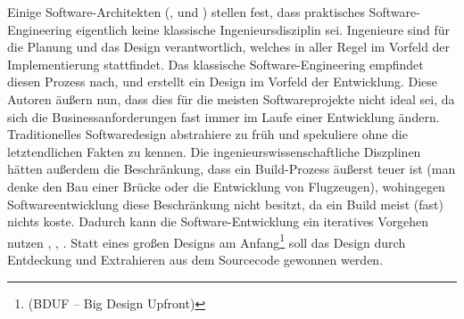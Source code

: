 



Einige Software-Architekten (\citeauthor*{neal_ford_emergent_2010}, \citeauthor*{jack_reeves_three_1992} und \citeauthor{glenn_vanderburg_real_2010}) stellen fest, dass praktisches Software\hyp{}Engineering eigentlich keine klassische Ingenieursdisziplin sei. Ingenieure sind für die Planung und das Design verantwortlich, welches in aller Regel im Vorfeld der Implementierung stattfindet. Das klassische Software-Engineering empfindet diesen Prozess nach, und erstellt ein Design im Vorfeld der Entwicklung. Diese Autoren äußern nun, dass dies für die meisten Softwareprojekte nicht ideal sei, da sich die Businessanforderungen fast immer im Laufe einer Entwicklung ändern. Traditionelles Softwaredesign abstrahiere zu früh und spekuliere ohne die letztendlichen Fakten zu kennen. Die ingenieurswissenschaftliche Diszplinen hätten außerdem die Beschränkung, dass ein Build-Prozess äußerst teuer ist (man denke den Bau einer Brücke oder die Entwicklung von Flugzeugen), wohingegen Softwareentwicklung diese Beschränkung nicht besitzt, da ein Build meist (fast) nichts koste. Dadurch kann die Software-Entwicklung ein iteratives Vorgehen nutzen \citep{neal_ford_emergent_2010}, \citep{glenn_vanderburg_real_2010}, \citep{jack_reeves_three_1992}. Statt eines großen Designs am Anfang\footnote{(BDUF -- Big Design Upfront)} soll das Design durch Entdeckung und Extrahieren aus dem Sourcecode gewonnen werden.

